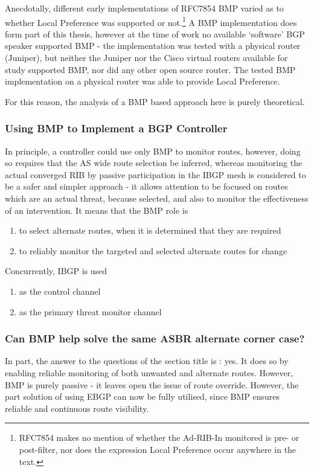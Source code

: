 Anecdotally, different early implementations of RFC7854 BMP varied as to whether
Local Preference was supported or not.\footnote{RFC7854 makes no mention of whether the Ad-RIB-In monitored is pre- or post-filter, nor does the expression Local Preference occur anywhere in the text.}
A BMP implementation does form part of this thesis, however at the time of work no available `software' BGP speaker supported BMP - the implementation was tested with a physical router (Juniper),
but neither the Juniper nor the Cisco virtual routers available for study supported BMP,
nor did any other open source router.
The tested BMP implementation on a physical router was able to provide Local Preference.

For this reason, the analysis of a BMP based approach here is purely
theoretical.

\subsubsection{Using BMP to Implement a BGP Controller}
In principle, a controller could use only BMP to monitor routes, however, doing
so requires that the AS wide route selection be inferred, whereas monitoring
the actual converged RIB by passive participation in the IBGP mesh is
considered to be a safer and simpler approach - it allows attention to be
focused on routes which are an actual threat, because selected, and also to
monitor the effectiveness of an intervention.  It means that the BMP role is

\begin{enumerate}
	\item to select alternate routes, when it is determined that they are required
	\item to reliably monitor the targeted and selected alternate routes for change
\end{enumerate}

Concurrently, IBGP is used
\begin{enumerate}
	\item as the control channel
	\item as the primary threat monitor channel
\end{enumerate}

\subsubsection{Can BMP help solve the same ASBR alternate corner case?}

In part, the answer to the questions of the section title is : yes.  It does so
by enabling reliable monitoring of both unwanted and alternate routes.
However, BMP is purely passive - it leaves open the issue of route override.
However, the part solution of using EBGP can now be fully utilised, since BMP
ensures reliable and continuous route visibility.

